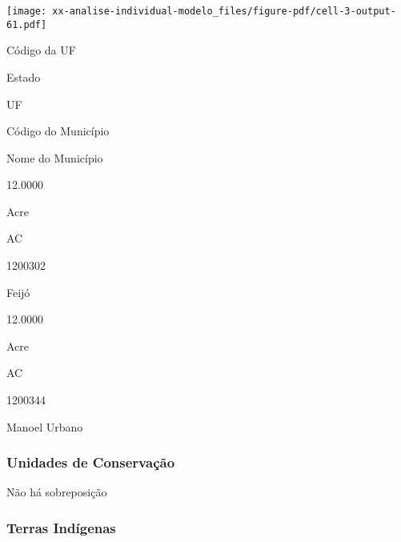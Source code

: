 \documentclass[
  11pt,
  a4paper,
  DIV=11,
  numbers=noendperiod]{scrartcl}
\begin{document}
\texttt{[image: xx-analise-individual-modelo\_files/figure-pdf/cell-3-output-61.pdf]}

\n  

\n    

\n      

Código da UF

\n      

Estado

\n      

UF

\n      

Código do Município

\n      

Nome do Município

\n    

\n  

\n  

\n    

\n      

12.0000

\n      

Acre

\n      

AC

\n      

1200302

\n      

Feijó

\n    

\n    

\n      

12.0000

\n      

Acre

\n      

AC

\n      

1200344

\n      

Manoel Urbano

\n    

\n  

\n

\subsubsection{Unidades de
Conservação}\label{unidades-de-conservauxe7uxe3o-3}

Não há sobreposição

\subsubsection{Terras Indígenas}\label{terras-induxedgenas-3}
\end{document}
